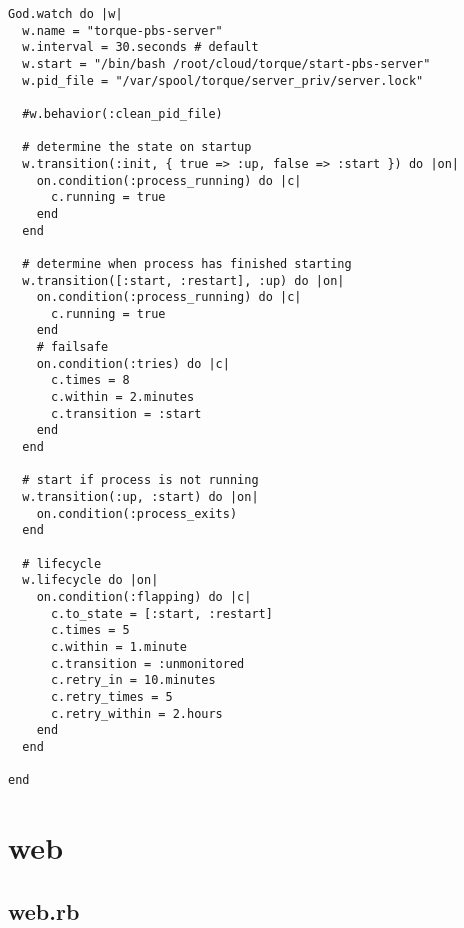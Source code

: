 \begin{lstlisting}
God.watch do |w|
  w.name = "torque-pbs-server"
  w.interval = 30.seconds # default      
  w.start = "/bin/bash /root/cloud/torque/start-pbs-server"
  w.pid_file = "/var/spool/torque/server_priv/server.lock"
    
  #w.behavior(:clean_pid_file)
  
  # determine the state on startup    
  w.transition(:init, { true => :up, false => :start }) do |on|      
    on.condition(:process_running) do |c|        
      c.running = true     
    end    
  end     

  # determine when process has finished starting    
  w.transition([:start, :restart], :up) do |on|      
    on.condition(:process_running) do |c|        
      c.running = true      
    end       
    # failsafe      
    on.condition(:tries) do |c|        
      c.times = 8        
      c.within = 2.minutes        
      c.transition = :start      
    end    
  end     

  # start if process is not running    
  w.transition(:up, :start) do |on|      
    on.condition(:process_exits)    
  end     

  # lifecycle    
  w.lifecycle do |on|      
    on.condition(:flapping) do |c|        
      c.to_state = [:start, :restart]        
      c.times = 5        
      c.within = 1.minute        
      c.transition = :unmonitored        
      c.retry_in = 10.minutes        
      c.retry_times = 5        
      c.retry_within = 2.hours      
    end    
  end
  
end
\end{lstlisting}
\section{web}
\subsection{web.rb}


